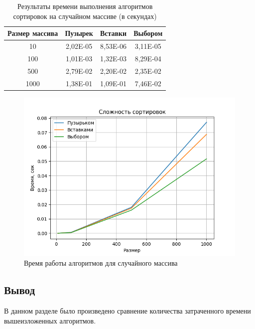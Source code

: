 \documentclass[14pt,russian]{scrartcl}
\begin{document}
    \begin{table}[htl]
        \caption{\centering Результаты времени выполнения алгоритмов сортировок на случайном массиве (в секундах)}
        \centering
        \begin{tabular}{|c|c|c|c|}
        \hline
        Размер массива & Пузырек  & Вставки  & Выбором  \\ \hline
        10            & 2,02E-05 & 8,53E-06 & 3,11E-05 \\ \hline
        100           & 1,01E-03 & 1,32E-03 & 8,29E-04 \\ \hline
        500           & 2,79E-02 & 2,20E-02 & 2,35E-02 \\ \hline
        1000           & 1,38E-01 & 1,09E-01 & 7,46E-02 \\ \hline
        \end{tabular}
        \label{tab:rand_bench}
    \end{table}

    \begin{figure}[htl]
	\centering
	\includegraphics[scale = 1]{random_vals.png}
	\caption{Время работы алгоритмов для случайного массива}
	\label{fig:plot_random}
\end{figure}

    \clearpage

    \subsection{Вывод}

    В данном разделе было произведено сравнение количества затраченного времени вышеизложенных алгоритмов.
    
\end{document}
